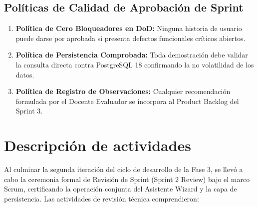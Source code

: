 \documentclass[12pt,a4paper]{article}
\begin{document}
\subsection{Políticas de Calidad de Aprobación de Sprint}
\begin{enumerate}[leftmargin=1.5em, itemsep=2pt]
    \item \textbf{Política de Cero Bloqueadores en DoD:} Ninguna historia de usuario puede darse por aprobada si presenta defectos funcionales críticos abiertos.
    \item \textbf{Política de Persistencia Comprobada:} Toda demostración debe validar la consulta directa contra PostgreSQL 18 confirmando la no volatilidad de los datos.
    \item \textbf{Política de Registro de Observaciones:} Cualquier recomendación formulada por el Docente Evaluador se incorpora al Product Backlog del Sprint 3.
\end{enumerate}

\section{Descripción de actividades}
Al culminar la segunda iteración del ciclo de desarrollo de la Fase 3, se llevó a cabo la ceremonia formal de Revisión de Sprint (Sprint 2 Review) bajo el marco Scrum, certificando la operación conjunta del Asistente Wizard y la capa de persistencia. Las actividades de revisión técnica comprendieron:
\end{document}
